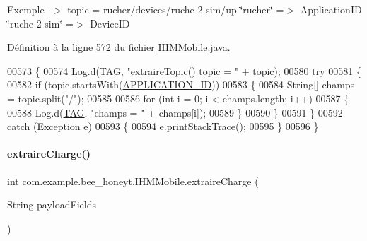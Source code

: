 Exemple -\/$>$ topic = rucher/devices/ruche-\/2-\/sim/up \char`\"{}rucher\char`\"{} =$>$ Application\+ID \char`\"{}ruche-\/2-\/sim\char`\"{} =$>$ Device\+ID

Définition à la ligne \hyperlink{_i_h_m_mobile_8java_source_l00572}{572} du fichier \hyperlink{_i_h_m_mobile_8java_source}{I\+H\+M\+Mobile.\+java}.


\begin{DoxyCode}
00573     \{
00574         Log.d(\hyperlink{classcom_1_1example_1_1bee__honeyt_1_1_i_h_m_mobile_a366987bf9bb2ed1010b2f967d4efa263}{TAG}, \textcolor{stringliteral}{"extraireTopic() topic = "} + topic);
00580         \textcolor{keywordflow}{try}
00581         \{
00582             \textcolor{keywordflow}{if} (topic.startsWith(\hyperlink{classcom_1_1example_1_1bee__honeyt_1_1_i_h_m_mobile_a92fe694fa515e68960a0add6212b2e86}{APPLICATION\_ID}))
00583             \{
00584                 String[] champs = topic.split(\textcolor{stringliteral}{"/"});
00585 
00586                 \textcolor{keywordflow}{for} (\textcolor{keywordtype}{int} i = 0; i < champs.length; i++)
00587                 \{
00588                     Log.d(\hyperlink{classcom_1_1example_1_1bee__honeyt_1_1_i_h_m_mobile_a366987bf9bb2ed1010b2f967d4efa263}{TAG}, \textcolor{stringliteral}{"champs = "} + champs[i]);
00589                 \}
00590             \}
00591         \}
00592         \textcolor{keywordflow}{catch} (Exception e)
00593         \{
00594             e.printStackTrace();
00595         \}
00596     \}
\end{DoxyCode}
\mbox{\label{classcom_1_1example_1_1bee__honeyt_1_1_i_h_m_mobile_a1c9c8df9039fc494293b40011ddf6f5e}} 
\paragraph{\texorpdfstring{extraire\+Charge()}{extraireCharge()}}
{\footnotesize\ttfamily int com.\+example.\+bee\+\_\+honeyt.\+I\+H\+M\+Mobile.\+extraire\+Charge (\begin{DoxyParamCaption}\item[{String}]{payload\+Fields }\end{DoxyParamCaption})\hspace{0.3cm}{\ttfamily [private]}}



